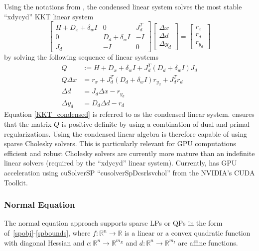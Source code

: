 Using the notations from \cite{petra_hiop}, the condensed linear system solves the most stable ``xdycyd'' KKT linear system 
\begin{equation} \label{KKT_xdycyd_condensed}
  \begin{bmatrix} 
  H+D_x+\delta_{w}I & 0  & J_d^T\\
  0  & D_d + \delta_{w}I &  -I\\
  J_d & -I & 0 
  \end{bmatrix}
  \begin{bmatrix} \Delta x \\ \Delta d \\ \Delta y_d  \end{bmatrix} = 
  \begin{bmatrix} r_x \\ r_d \\ r_{y_d}\end{bmatrix} 
\end{equation}
by solving the following sequence of linear systems
\begin{align}
  Q & := H+D_x+\delta_wI + J_d^T(D_d+\delta_w I)J_d   \\
  Q\Delta x & = r_x + J_d^T(D_d+\delta_w I)r_{y_d} + J_d^T r_d \label{KKT_condensed} \\
  \Delta d & = J_d \Delta x- r_{y_d} \\
  \Delta y_d   & = D_d \Delta d - r_d 
\end{align}
Equation \eqref{KKT_condensed} is referred to as the condensed linear system. \Hi ensures that the matrix $Q$ is positive definite by using a combination of dual and primal regularizations. Using the condensed linear algebra is therefore capable of using  sparse Cholesky solvers. This is particularly relevant for GPU computations  efficient and robust Cholesky solvers  are currently more mature than an indefinite linear solvers (required by the ``xdycyd'' linear system). Currently, \Hi has GPU acceleration using  cuSolverSP ``cusolverSpDcsrlsvchol'' from the NVIDIA's CUDA Toolkit.



\subsubsection{Normal Equation}\label{kkt:normaeqn}

The normal equation approach supports sparse LPs or QPs in the form of~\eqref{spobj}-\eqref{spbounds}, where $f:\mathbb{R}^n\rightarrow\mathbb{R}$ is a linear or a convex quadratic function with diagonal Hessian and $c:\mathbb{R}^n\rightarrow\mathbb{R}^{m_E}$ and $d:\mathbb{R}^n\rightarrow\mathbb{R}^{m_I}$ are affine functions.

